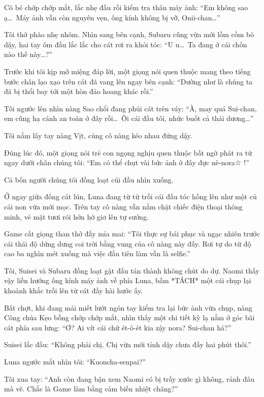 \documentclass[../main.tex]{subfiles}
\begin{document}
Cô bé chớp chớp mắt, lắc nhẹ đầu rồi kiểm tra thân máy ảnh: ``Em không sao ạ\dots\ Máy ảnh vẫn còn nguyên vẹn, ống kính không bị vỡ, Onii-chan\dots''

Tôi thở phào nhẹ nhõm. Nhìn sang bên cạnh, Subaru cũng vừa mới lồm cồm bò dậy, hai tay ôm đầu lắc lắc cho cát rơi ra khỏi tóc: ``U u\dots\ Ta đang ở cái chốn nào thế này\dots?''


Trước khi tôi kịp mở miệng đáp lời, một giọng nói quen thuộc mang theo tiếng bước chân lạo xạo trên cát đã vang lên ngay bên cạnh: ``Dường như là chúng ta đã bị thổi bay tới một hòn đảo hoang khác rồi.''

Tôi ngước lên nhìn nàng Sao chổi đang phủi cát trên váy: ``À, may quá Sui-chan, em cũng hạ cánh an toàn ở đây rồi\dots\ Ôi cái đầu tôi, nhức buốt cả thái dương\dots''

Tôi nắm lấy tay nàng Vịt, cùng cô nàng kéo nhau đứng dậy.

Đúng lúc đó, một giọng nói trẻ con ngọng nghịu quen thuộc bất ngờ phát ra từ ngay dưới chân chúng tôi: ``Em có thể chụt vài bức ảnh ở đây đực nè-nora☆ !''

Cả bốn người chúng tôi đồng loạt cúi đầu nhìn xuống.

Ở ngay giữa đống cát lún, Luna đang từ từ trồi cái đầu tóc hồng lên như một củ cải non vừa mới mọc. Trên tay cô nàng vẫn nắm chặt chiếc điện thoại thông minh, vẻ mặt tươi rói hớn hở giơ lên tự sướng.

Game cất giọng than thở đầy mỉa mai: ``Tôi thực sự bái phục và ngạc nhiên trước cái thái độ dửng dưng coi trời bằng vung của cô nàng này đấy. Rơi tự do từ độ cao ba nghìn mét xuống mà việc đầu tiên làm vẫn là selfie.''

Tôi, Suisei và Subaru đồng loạt gật đầu tán thành không chút do dự. Naomi thấy vậy liền hướng ống kính máy ảnh về phía Luna, bấm *TÁCH* một cái chụp lại khoảnh khắc trồi lên từ cát đầy hài hước ấy.


Bất chợt, khi đang mải miết lướt ngón tay kiểm tra lại bức ảnh vừa chụp, nàng Công chúa Kẹo bỗng chớp chớp mắt, nhìn thấy một chi tiết kỳ lạ nằm ở góc bãi cát phía sau lưng: ``Ơ? Ai vít cái chữ ét-ô-ét kia zậy nora? Sui-chan hả?''

Suisei lắc đầu: ``Không phải chị. Chị vừa mới tỉnh dậy chưa đầy hai phút thôi.''

Luna ngước mắt nhìn tôi: ``Kuoncha-senpai?''

Tôi xua tay: ``Anh còn đang bận xem Naomi có bị trầy xước gì không, rảnh đâu mà vẽ. Chắc là Game làm bằng cảm biến nhiệt chăng?''
\end{document}

